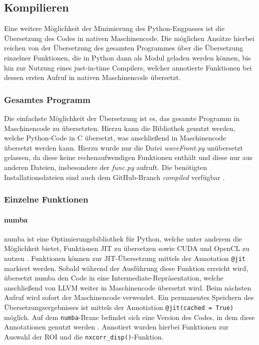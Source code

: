 \subsection{Kompilieren}

Eine weitere Möglichkeit der Minimierung des Python-Engpasses ist die Übersetzung des Codes in nativen Maschinencode. Die möglichen Ansätze hierbei reichen von der Übersetzung des gesamten Programmes über die Übersetzung einzelner Funktionen, die in Python dann als Modul geladen werden können, bis hin zur Nutzung eines just-in-time Compilers, welcher annotierte Funktionen bei dessen ersten Aufruf in nativen Maschinencode übersetzt. 

\subsubsection{Gesamtes Programm}

Die einfachste Möglichkeit der Übersetzung ist es, das gesamte Programm in Maschinencode zu übersetzten. Hierzu kann die Bibliothek \cite{BBD+17} genutzt werden, welche Python-Code in C übersetzt, was anschließend in Maschinencode übersetzt werden kann. Hierzu wurde nur die Datei \textit{waveFront.py} unübersetzt gelassen, da diese keine rechenaufwendigen Funktionen enthält und diese nur aus anderen Dateien, insbesondere der \textit{func.py} aufruft. Die benötigten Installationsdateien sind auch dem GitHub-Branch \textit{compiled} verfügbar \cite{Coj17}. 

\subsubsection{Einzelne Funktionen}

\paragraph{numba}

numba ist eine Optimierungsbibliothek für Python, welche unter anderem die Möglichkeit bietet, Funktionen \gls{JIT} zu übersetzen sowie CUDA und OpenCL zu nutzen \cite{LPS15}. Funktionen können zur \gls{JIT}-Übersetzung mittels der Annotation \texttt{@jit} markiert werden. Sobald während der Ausführung diese Funktion erreicht wird, übersetzt numba den Code in eine Intermediate-Repräsentation, welche anschließend von LLVM weiter in Maschinencode übersetzt wird. Beim nächsten Aufruf wird sofort der Maschinencode verwendet. Ein permanentes Speichern des Übersetzungsergebnisses ist mittels der Annotiation \texttt{@jit(cached = True)} möglich. Auf dem \texttt{numba}-Branc befindet sich eine Version des Codes, in dem diese Annotationen genutzt werden \cite{Coj17}. Annotiert wurden hierbei Funktionen zur Auswahl der \gls{ROI} und die \texttt{nxcorr\_disp()}-Funktion.

